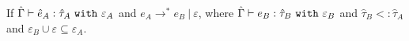 \begin{theorem}
If $\hat \Gamma \vdash \hat e_A: \hat \tau_A~\mathtt{with}~ \varepsilon_A$ and $e_A \longrightarrow^{*} e_B~|~\varepsilon$, where $\hat \Gamma \vdash e_B: \hat \tau_B~\mathtt{with}~ \varepsilon_B$ and $\hat \tau_B <: \hat \tau_A$ and $\varepsilon_B \cup \varepsilon \subseteq \varepsilon_A$.
\end{theorem}






